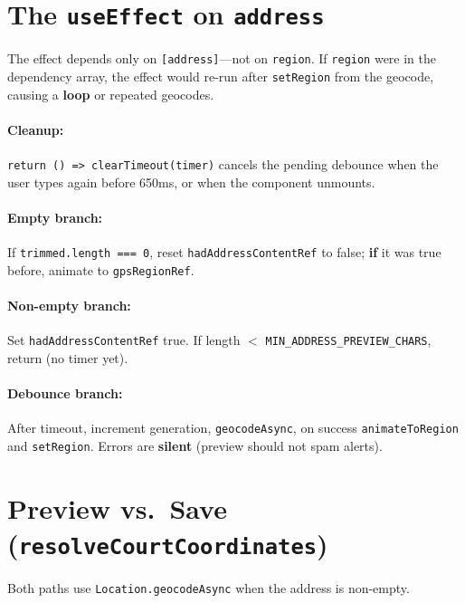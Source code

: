 \documentclass[11pt,a4paper]{article}
\begin{document}
\section{The \texttt{useEffect} on \texttt{address}}

The effect depends only on \texttt{[address]}---not on \texttt{region}. If \texttt{region} were in the dependency array, the effect would re-run after \texttt{setRegion} from the geocode, causing a \textbf{loop} or repeated geocodes.

\paragraph{Cleanup:} \texttt{return () => clearTimeout(timer)} cancels the pending debounce when the user types again before 650ms, or when the component unmounts.

\paragraph{Empty branch:} If \texttt{trimmed.length === 0}, reset \texttt{hadAddressContentRef} to false; \textbf{if} it was true before, animate to \texttt{gpsRegionRef}.

\paragraph{Non-empty branch:} Set \texttt{hadAddressContentRef} true. If length $<$ \texttt{MIN\_ADDRESS\_PREVIEW\_CHARS}, return (no timer yet).

\paragraph{Debounce branch:} After timeout, increment generation, \texttt{geocodeAsync}, on success \texttt{animateToRegion} and \texttt{setRegion}. Errors are \textbf{silent} (preview should not spam alerts).

\section{Preview vs.\ Save (\texttt{resolveCourtCoordinates})}

Both paths use \texttt{Location.geocodeAsync} when the address is non-empty.
\end{document}
